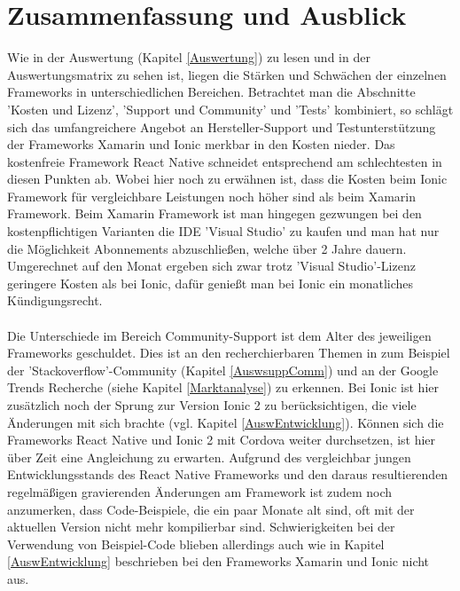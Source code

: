 \chapter{Zusammenfassung und Ausblick}

Wie in der Auswertung (Kapitel \ref{Auswertung}) zu lesen und in der Auswertungsmatrix zu sehen ist, liegen die Stärken und Schwächen der einzelnen Frameworks in unterschiedlichen Bereichen. Betrachtet man die Abschnitte 'Kosten und Lizenz', 'Support und Community' und 'Tests' kombiniert, so schlägt sich das umfangreichere Angebot an Hersteller-Support und Testunterstützung der Frameworks Xamarin und Ionic merkbar in den Kosten nieder. Das kostenfreie Framework React Native schneidet entsprechend am schlechtesten in diesen Punkten ab. Wobei hier noch zu erwähnen ist, dass die Kosten beim Ionic Framework für vergleichbare Leistungen noch höher sind als beim Xamarin Framework. Beim Xamarin Framework ist man hingegen gezwungen bei den kostenpflichtigen Varianten die IDE 'Visual Studio' zu kaufen und man hat nur die Möglichkeit Abonnements abzuschließen, welche über 2 Jahre dauern. Umgerechnet auf den Monat ergeben sich zwar trotz 'Visual Studio'-Lizenz geringere Kosten als bei Ionic, dafür genießt man bei Ionic ein monatliches Kündigungsrecht. 
\\
\\
Die Unterschiede im Bereich Community-Support ist dem Alter des jeweiligen Frameworks geschuldet. Dies ist an den recherchierbaren Themen in zum Beispiel der 'Stackoverflow'-Community (Kapitel \ref{AuswsuppComm}) und an der Google Trends Recherche (siehe Kapitel \ref{Marktanalyse}) zu erkennen. Bei Ionic ist hier zusätzlich noch der Sprung zur Version Ionic 2 zu berücksichtigen, die viele Änderungen mit sich brachte (vgl. Kapitel \ref{AuswEntwicklung}). Können sich die Frameworks React Native und Ionic 2 mit Cordova weiter durchsetzen, ist hier über Zeit eine Angleichung zu erwarten. Aufgrund des vergleichbar jungen Entwicklungsstands des React Native Frameworks und den daraus resultierenden regelmäßigen gravierenden Änderungen am Framework ist zudem noch anzumerken, dass Code-Beispiele, die ein paar Monate alt sind, oft mit der aktuellen Version nicht mehr kompilierbar sind. Schwierigkeiten bei der Verwendung von Beispiel-Code blieben allerdings auch wie in Kapitel \ref{AuswEntwicklung} beschrieben bei den Frameworks Xamarin und Ionic nicht aus.
\\
\\
